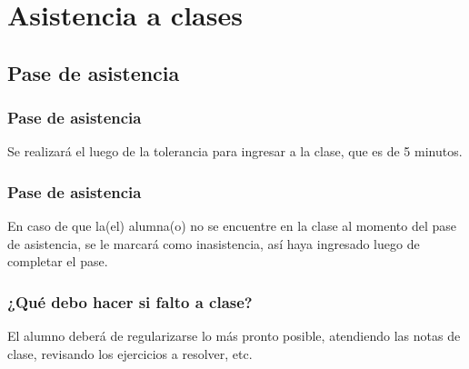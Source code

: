 \documentclass[14pt]{beamer}
\begin{document}


\section{Asistencia a clases}
\subsection{Pase de asistencia}

\begin{frame}
\frametitle{Pase de asistencia}
Se realizará el  luego de la tolerancia para ingresar a la clase, que es de 5 minutos.
\end{frame}
\begin{frame}
\frametitle{Pase de asistencia}
En caso de que la(el) alumna(o) no se encuentre en la clase al momento del pase de asistencia, se le marcará como inasistencia, así haya ingresado luego de completar el pase.
\end{frame}
\begin{frame}
\frametitle{¿Qué debo hacer si falto a clase?}
El alumno deberá de regularizarse lo más pronto posible, atendiendo las notas de clase, revisando los ejercicios a resolver, etc.
\end{frame}
\end{document}

